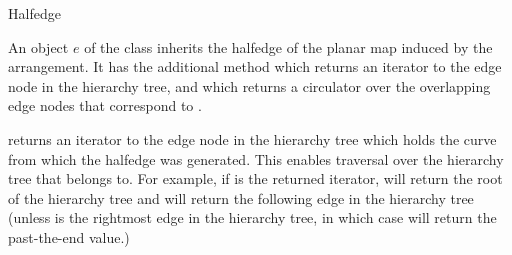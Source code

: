 
\ccRefPageBegin


\begin{ccRefClass}{Halfedge}

  
\ccDefinition An object $e$ of the class
     inherits the halfedge of the planar map induced by the 
    arrangement. %
    It has the additional method  which returns
    an iterator to the edge node in the hierarchy tree, and
     which returns a circulator over the overlapping edge
    nodes that correspond to \ccVar.

\ccOperations
    {returns an iterator to the edge node in the hierarchy tree which
       holds the curve from 
       which the halfedge was generated. This enables
       traversal over the hierarchy tree that \ccVar{} belongs to.
       For example, if  is the returned iterator, 
        will return the root of the hierarchy tree and
       will return the following edge in the hierarchy tree (unless 
       is the rightmost edge in the hierarchy tree, in which case 
       will return the past-the-end value.)}


\end{ccRefClass}

\ccRefPageEnd
